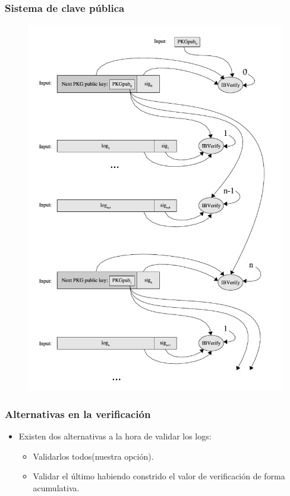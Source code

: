 \documentclass[10pt, a4paper,english,spanish]{beamer}
\begin{document}
\begin{frame}
\frametitle{Sistema de clave pública}
\begin{figure}
  \includegraphics[scale=0.4]{imagenes/PKG2.png}
\end{figure}
\end{frame}

\begin{frame}
\frametitle{Alternativas en la verificación}
\begin{itemize}
\item Existen dos alternativas a la hora de validar los logs:
\begin{itemize}
\item Validarlos todos(nuestra opción).
\item Validar el último habiendo constrido el valor de verificación de forma acumulativa.
\end{itemize}
\end{itemize}
\end{frame}
\end{document}
